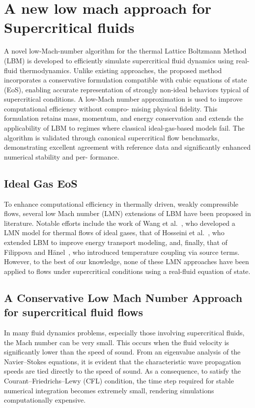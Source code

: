 \chapter{A new low mach approach for Supercritical fluids}
\chaptertoc{}

A novel low-Mach-number algorithm for the thermal Lattice Boltzmann Method (LBM)
is developed to efficiently simulate supercritical fluid dynamics using
real-fluid thermodynamics. Unlike existing approaches, the proposed method
incorporates a conservative formulation compatible with cubic equations of state
(EoS), enabling accurate representation of strongly non-ideal behaviors typical
of supercritical conditions. A low-Mach number approximation is used to improve
computational efficiency without compro- mising physical fidelity. This
formulation retains mass, momentum, and energy conservation and extends the
applicability of LBM to regimes where classical ideal-gas-based models fail. The
algorithm is validated through canonical supercritical flow benchmarks,
demonstrating excellent agreement with reference data and significantly enhanced
numerical stability and per- formance.

\section{Ideal Gas EoS}

To enhance computational efficiency in thermally driven, weakly compressible
flows, several low Mach number (LMN) extensions of LBM have been proposed in
literature. Notable efforts include the work of Wang et al.~\cite{wang2022new},
who developed a LMN model for thermal flows of ideal gases, that of Hosseini et
al.~\cite{hosseini2023low}, who extended LBM to improve energy transport
modeling, and, finally, that of  Filippova and Hänel~\cite{filippova2000novel},
who introduced temperature coupling via source terms. However, to the best of
our knowledge, none of these LMN approaches have been applied to flows under
supercritical conditions using a real-fluid equation of state.

\section{A Conservative Low Mach Number Approach for supercritical fluid flows}

In many fluid dynamics problems, especially those involving supercritical
fluids, the Mach number can be very small. This occurs when the fluid velocity
is significantly lower than the speed of sound. From an eigenvalue analysis of
the Navier–Stokes equations, it is evident that the characteristic wave
propagation speeds are tied directly to the speed of sound. As a consequence, to
satisfy the Courant–Friedrichs–Lewy (CFL) condition, the time step required for
stable numerical integration becomes extremely small, rendering simulations
computationally expensive.

